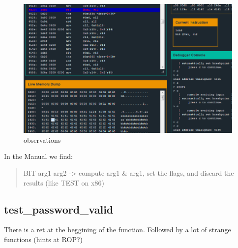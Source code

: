 \documentclass[a4paper,11pt]{article}
\begin{document}
\begin{figure}[htbp]
\centering
\includegraphics{img/14_2.PNG}
\caption{observations}
\end{figure}

In the Manual we find:

\begin{quote}
BIT arg1 arg2 -\textgreater{} compute arg1 \& arg1, set the flags, and
discard the results (like TEST on x86)
\end{quote}

\subsection{test\_password\_valid}\label{testux5fpasswordux5fvalid-1}

There is a ret at the beggining of the function. Followed by a lot of
strange functions (hints at ROP?)
\end{document}
